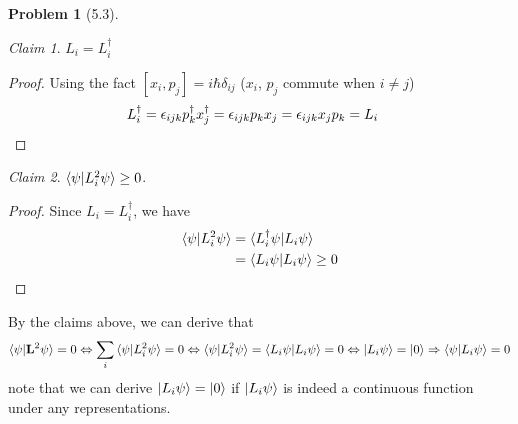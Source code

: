 \documentclass[twoside,11pt]{article}
\theoremstyle{definition}
\newtheorem{problem}{Problem}
\theoremstyle{remark}
\newtheorem*{claim}{Claim}
\begin{document}
\begin{problem}[5.3]
\begin{claim}
    $L_i = L_i^\dagger$
\end{claim}
\begin{proof}
    Using the fact $[x_i,p_j]=i\hbar\delta_{ij}$ ($x_i$, $p_j$ commute when $i\neq j$)
    \begin{align*}
        L_i^\dag &= \epsilon_{ijk}p_k^\dag x_j^\dag = 
        \epsilon_{ijk}p_kx_j = \epsilon_{ijk} x_jp_k = L_i\qedhere
    \end{align*}
\end{proof}
\begin{claim}
    $\braket{\psi|L_i^2\psi}\geq 0$.
\end{claim}
\begin{proof}
    Since $L_i=L_i^\dagger$, we have
    \begin{align*}
        \braket{\psi|L_i^2\psi} &= \braket{L_i^\dagger\psi|L_i\psi}\\
        &= \braket{L_i\psi|L_i\psi} \geq 0\qedhere
    \end{align*}
\end{proof}

By the claims above, we can derive that
\begin{align*}
    \braket{\psi|\mathbf{L}^2\psi} = 0\Leftrightarrow
    \sum_{i}\braket{\psi|L_i^2\psi} = 0\Leftrightarrow
    \braket{\psi|L_i^2\psi} = \braket{L_i\psi|L_i\psi} = 0
    \Leftrightarrow \ket{L_i\psi} = \ket{0}\Rightarrow
    \braket{\psi|L_i\psi} = 0
\end{align*}
note that we can derive $\ket{L_i\psi}=\ket{0}$ 
if $\ket{L_i\psi}$ is indeed a continuous function under any
representations.


\end{problem}


\end{document}
